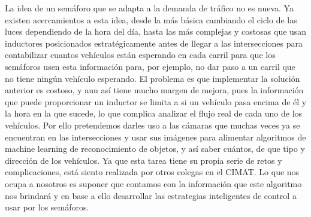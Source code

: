 La idea de un semáforo que se adapta a la demanda de tráfico no es
nueva. Ya existen acercamientos a esta idea, desde la más básica
cambiando el ciclo de las luces dependiendo de la hora del día, hasta
las más complejas y costosas que usan inductores posicionados
estratégicamente antes de llegar a las intersecciones para contabilizar
cuantos vehículos están esperando en cada carril para que los semáforos
usen esta información para, por ejemplo, no dar paso a un carril que no
tiene ningún vehículo esperando. El problema es que implementar la
solución anterior es costoso, y aun así tiene mucho margen de mejora,
pues la información que puede proporcionar un inductor se limita a si un
vehículo pasa encima de él y la hora en la que sucede, lo que complica
analizar el flujo real de cada uno de los vehículos. Por ello
pretendemos darles uso a las cámaras que muchas veces ya se encuentran
en las intersecciones y usar sus imágenes para alimentar algoritmos de
machine learning de reconocimiento de objetos, y así saber cuántos, de
que tipo y dirección de los vehículos. Ya que esta tarea tiene su propia
serie de retos y complicaciones, está siento realizada por otros colegas
en el CIMAT. Lo que nos ocupa a nosotros es suponer que contamos con la
información que este algoritmo nos brindará y en base a ello desarrollar
las estrategias inteligentes de control a usar por los semáforos.
